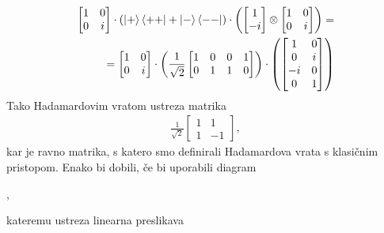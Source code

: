 \documentclass[mat1]{fmfdelo}
\begin{document}
\begin{align*}
    \begin{bmatrix}
        1&0\\0&i
    \end{bmatrix}\cdot \left(\ket{+}\bra{++}+\ket{-}\bra{--}\right)\cdot \left(\begin{bmatrix}
        1\\-i
    \end{bmatrix}\otimes\begin{bmatrix}
        1&0\\0&i
    \end{bmatrix}\right) =\\
    =\begin{bmatrix}
        1&0\\0&i
    \end{bmatrix}\cdot\left( \frac{1}{\sqrt2}\begin{bmatrix}
        1&0&0&1\\
        0&1&1&0
    \end{bmatrix}\right) \cdot
    \left(\begin{bmatrix}
        1 &0\\
        0 &i\\
        -i&0\\
        0 &1
    \end{bmatrix}
    \right)
\end{align*}
Tako Hadamardovim vratom ustreza matrika
\begin{align*}
    \frac{1}{\sqrt2}\begin{bmatrix}
        1&1\\
        1&-1
    \end{bmatrix},
\end{align*}
kar je ravno matrika, s katero smo definirali Hadamardova vrata s klasičnim pristopom. Enako bi dobili, če bi uporabili diagram 
\begin{center}
    ,
\end{center}
kateremu ustreza linearna preslikava 
\end{document}
